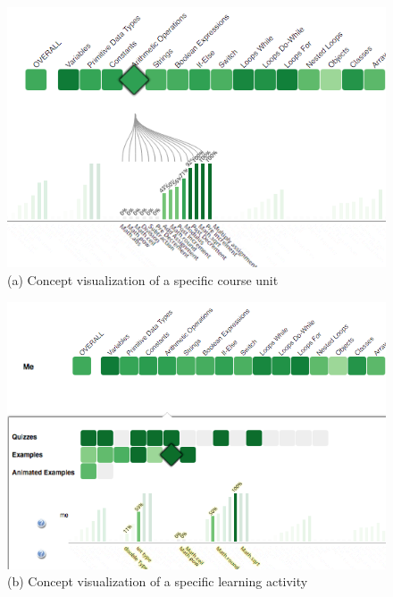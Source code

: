 \documentclass{sig-alternate}
\begin{document}



\begin{figure}[!t]
\centering
\begin{minipage}{.5\textwidth}
  \centering
  \includegraphics[width = \linewidth]{obr1.png}
  (a) Concept visualization of a specific course unit
\end{minipage}%
\begin{minipage}{.5\textwidth}
  \centering
  \includegraphics[width=\linewidth]{obr2.png}
  (b) Concept visualization of a specific learning activity
\end{minipage}
\label{fig:fig1}
\end{figure}
\end{document}
